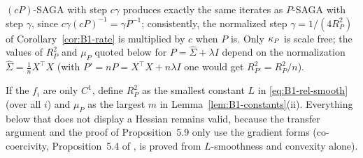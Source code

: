 \begin{remark}\label{rem:B1-scaling}
$(cP)$-SAGA with step $c\gamma$ produces exactly the same iterates as $P$-SAGA with step $\gamma$, since
$c\gamma(cP)^{-1}=\gamma P^{-1}$; consistently, the normalized step $\gamma=1/(4R_P^2)$ of
Corollary~\ref{cor:B1-rate} is multiplied by $c$ when $P$ is. Only $\kappa_P$ is scale free; the values of
$R_P^2$ and $\mu_P$ quoted below for $P=\hat\Sigma+\lambda I$ depend on the normalization
$\hat\Sigma=\frac1nX^\top X$ (with $P'=nP=X^\top X+n\lambda I$ one would get $R_{P'}^2=R_P^2/n$).
\end{remark}

\begin{remark}[$C^1$ functions]\label{rem:B1-C1}
If the $f_i$ are only $C^1$, define $R_P^2$ as the smallest constant $L$ in \eqref{eq:B1-rel-smooth}
(over all $i$) and $\mu_P$ as the largest $m$ in Lemma~\ref{lem:B1-constants}(ii). Everything below that
does not display a Hessian remains valid, because the transfer argument and the proof of Proposition~5.9
only use the gradient forms (co-coercivity, Proposition~5.4 of \cite{bach2024learning}, is proved from
$L$-smoothness and convexity alone).
\end{remark}

